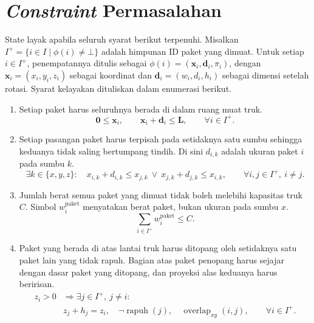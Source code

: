 \section{\textit{Constraint} Permasalahan}

State layak apabila seluruh syarat berikut terpenuhi. Misalkan $I^+=\{i\in I\mid\phi(i)\neq\bot\}$ adalah himpunan ID paket yang dimuat. Untuk setiap $i\in I^+$, penempatannya ditulis sebagai $\phi(i)=(\mathbf{x}_i,\mathbf{d}_i,\pi_i)$, dengan $\mathbf{x}_i=(x_i,y_i,z_i)$ sebagai koordinat dan $\mathbf{d}_i=(w_i,d_i,h_i)$ sebagai dimensi setelah rotasi. Syarat kelayakan dituliskan dalam enumerasi berikut.

\begin{enumerate}
    \renewcommand{\labelenumi}{(\arabic{enumi})}
    \item Setiap paket harus seluruhnya berada di dalam ruang muat truk. 
          \begin{equation*}
              \mathbf{0}\leq\mathbf{x}_i,\qquad \mathbf{x}_i+\mathbf{d}_i\leq\mathbf{L},\qquad \forall i\in I^+.
          \end{equation*}

    \item Setiap pasangan paket harus terpisah pada setidaknya satu sumbu sehingga keduanya tidak saling bertumpang tindih. Di sini $d_{i,k}$ adalah ukuran paket $i$ pada sumbu $k$. 
          \begin{equation*}
              \exists k\in\{x,y,z\}:\quad x_{i,k}+d_{i,k}\leq x_{j,k}\ \lor\ x_{j,k}+d_{j,k}\leq x_{i,k},\qquad \forall i,j\in I^+,\ i\neq j.
          \end{equation*}

    \item Jumlah berat semua paket yang dimuat tidak boleh melebihi kapasitas truk $C$. Simbol $w_i^{\text{paket}}$ menyatakan berat paket, bukan ukuran pada sumbu $x$. 
          \begin{equation*}
              \sum_{i\in I^+}w_i^{\text{paket}}\leq C.
          \end{equation*}

    \item Paket yang berada di atas lantai truk harus ditopang oleh setidaknya satu paket lain yang tidak rapuh. Bagian atas paket penopang harus sejajar dengan dasar paket yang ditopang, dan proyeksi alas keduanya harus beririsan. 
          \begin{equation*}
              \begin{aligned}
                  z_i>0 & \Rightarrow \exists j\in I^+,\ j\neq i:                                                                       \\
                        & z_j+h_j=z_i,\quad \neg\operatorname{rapuh}(j),\quad \operatorname{overlap}_{xy}(i,j),\qquad \forall i\in I^+.
              \end{aligned}
          \end{equation*}
\end{enumerate}

